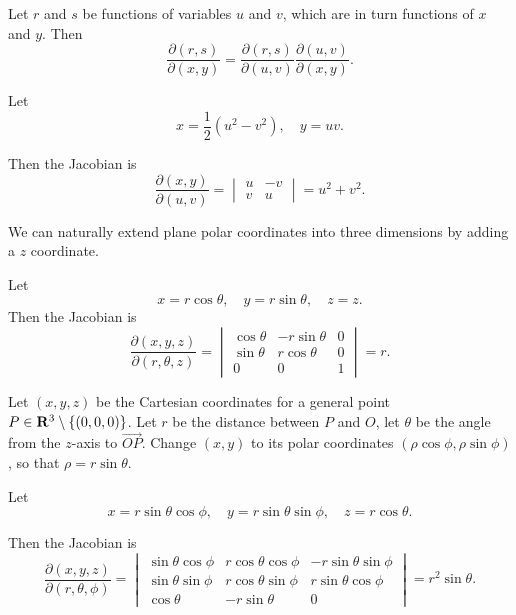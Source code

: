 \begin{proposition}
Let $r$ and $s$ be functions of variables $u$ and $v$, which are in turn functions of $x$ and $y$. Then
\[\frac{\partial(r,s)}{\partial(x,y)}=\frac{\partial(r,s)}{\partial(u,v)}\frac{\partial(u,v)}{\partial(x,y)}.\]
\end{proposition}

\begin{example}
Let
\[x=\frac{1}{2}(u^2-v^2),\quad y=uv.\]

Then the Jacobian is
\[\frac{\partial(x,y)}{\partial(u,v)}=\begin{vmatrix}
u&-v\\
v&u
\end{vmatrix}=u^2+v^2.\]
\end{example}

We can naturally extend plane polar coordinates into three dimensions by adding a $z$ coordinate.

\begin{example}
Let
\[x=r\cos\theta,\quad y=r\sin\theta,\quad z=z.\]
Then the Jacobian is
\[\frac{\partial(x,y,z)}{\partial(r,\theta,z)}=\begin{vmatrix}
\cos\theta&-r\sin\theta&0\\
\sin\theta&r\cos\theta&0\\
0&0&1
\end{vmatrix}=r.\]
\end{example}

\begin{example}
Let $(x,y,z)$ be the Cartesian coordinates for a general point $P\in\mathbf R^3\setminus\{(0,0,0)\}$. Let $r$ be the distance between $P$ and $O$, let $\theta$ be the angle from the $z$-axis to $\overrightarrow{OP}$. Change $(x,y)$ to its polar coordinates $(\rho\cos\phi,\rho\sin\phi)$, so that $\rho=r\sin\theta$.

Let
\[x=r\sin\theta\cos\phi,\quad y=r\sin\theta\sin\phi,\quad z=r\cos\theta.\]

Then the Jacobian is
\[\frac{\partial(x,y,z)}{\partial(r,\theta,\phi)}=\begin{vmatrix}
\sin\theta\cos\phi&r\cos\theta\cos\phi&-r\sin\theta\sin\phi\\
\sin\theta\sin\phi&r\cos\theta\sin\phi&r\sin\theta\cos\phi\\
\cos\theta&-r\sin\theta&0
\end{vmatrix}=r^2\sin\theta.\]
\end{example}


